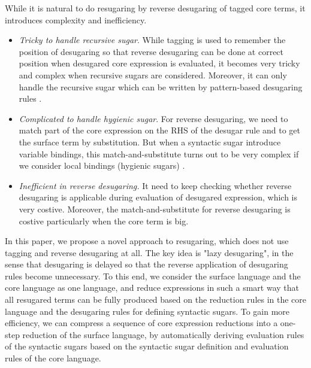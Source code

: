 While it is natural to do resugaring by reverse desugaring of tagged core terms, it introduces complexity and inefficiency.
\begin{itemize}
\item {\em Tricky to handle recursive sugar}. While tagging is used to remember the position of desugaring so that reverse desugaring can be done at correct position when desugared core expression is evaluated, it  becomes very tricky and complex when recursive sugars are considered. Moreover, it can only handle the recursive sugar which can be written by pattern-based desugaring rules \cite{resugaring}.%

\item {\em Complicated to handle hygienic sugar}. For reverse desugaring, we need to match part of the core expression on the RHS of the desugar rule and to get the surface term by substitution. But when a syntactic sugar introduce variable bindings, this match-and-substitute turns out to be very complex if we consider local bindings (hygienic sugars) \cite{hygienic}.

\item {\em Inefficient in reverse desugaring.} It need to keep checking whether reverse desugaring is applicable during evaluation of desugared expression, which is very costive. Moreover, the match-and-substitute for reverse desugaring is costive particularly when the core term is big.

\end{itemize}

In this paper, we propose a novel approach to resugaring, which does not use tagging and reverse desugaring at all.
The key idea is "lazy desugaring", in the sense that desugaring is delayed so that the reverse application of desugaring rules become unnecessary.
To this end, we consider the surface language and the core language as one language, and reduce expressions in such a smart way that all resugared terms can be fully produced based on the reduction rules in the core language and  the desugaring rules for defining syntactic sugars. To gain more efficiency, we can compress a sequence of core expression reductions into a one-step reduction of the surface language, by automatically deriving evaluation rules of the syntactic sugars based on the syntactic sugar definition and evaluation rules of the core language.


